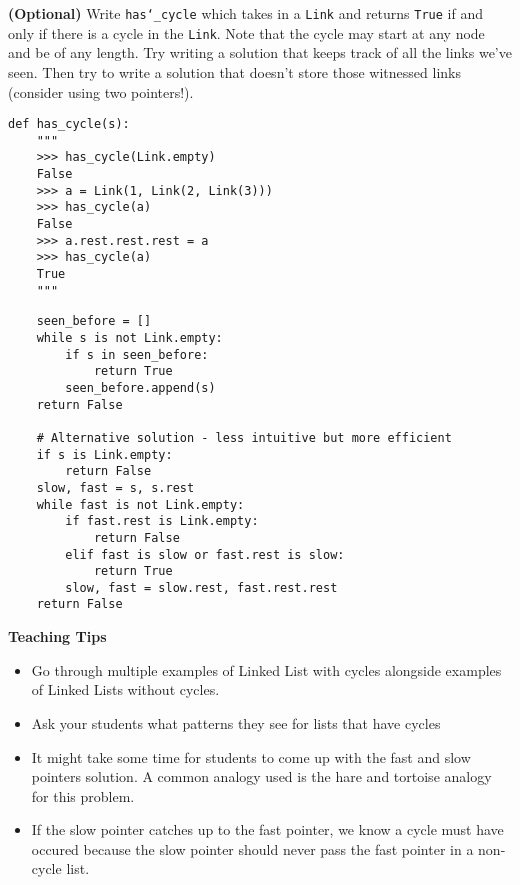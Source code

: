 \begin{blocksection}
\question \textbf{(Optional)} Write \texttt{has\char`_cycle} which takes in a
\texttt{Link} and returns \texttt{True} if and only if there is a cycle in the
\texttt{Link}. Note that the cycle may start at any node and be of any length.
Try writing a solution that keeps track of all the links we've seen. Then try to
write a solution that doesn't store those witnessed links (consider using
two pointers!).

\begin{lstlisting}
def has_cycle(s):
    """
    >>> has_cycle(Link.empty)
    False
    >>> a = Link(1, Link(2, Link(3)))
    >>> has_cycle(a)
    False
    >>> a.rest.rest.rest = a
    >>> has_cycle(a)
    True
    """
\end{lstlisting}

\begin{solution}
\begin{lstlisting}
    seen_before = []
    while s is not Link.empty:
        if s in seen_before:
            return True 
        seen_before.append(s)
    return False

    # Alternative solution - less intuitive but more efficient
    if s is Link.empty:
        return False
    slow, fast = s, s.rest
    while fast is not Link.empty:
        if fast.rest is Link.empty:
            return False
        elif fast is slow or fast.rest is slow:
            return True
        slow, fast = slow.rest, fast.rest.rest
    return False
\end{lstlisting}
\end{solution}
\end{blocksection}

\begin{blocksection}
\begin{guide}
    \textbf{Teaching Tips}
    \begin{itemize}
       \item Go through multiple examples of Linked List with cycles alongside examples of Linked Lists without cycles.
       \item Ask your students what patterns they see for lists that have cycles
       \item It might take some time for students to come up with the fast and slow pointers solution. A common analogy used is the hare and tortoise analogy for this problem.
       \item If the slow pointer catches up to the fast pointer, we know a cycle must have occured because the slow pointer should never pass the fast pointer in a non-cycle list.
    \end{itemize}
 \end{guide}
\end{blocksection}
